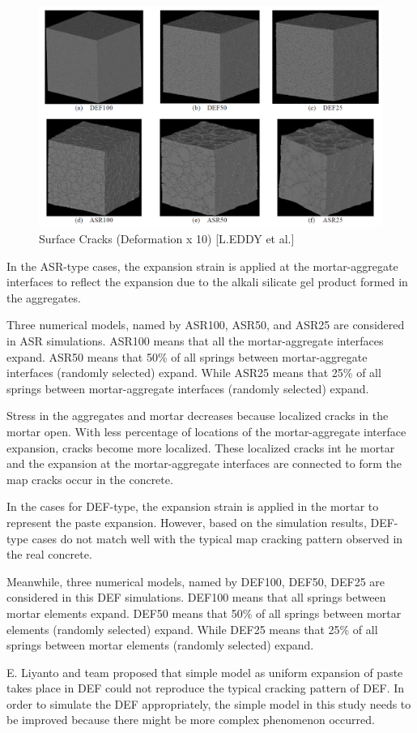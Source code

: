 \begin{itemize}
    \begin{figure}[ht!]
        \centering
        \includegraphics[width=.9\linewidth]{Files/Background/EDDY.png}
        \caption{Surface Cracks (Deformation x 10) [L.EDDY et al.]}
        \label{fig:EDDY}
    \end{figure}

    In the ASR-type cases, the expansion strain is applied at the mortar-aggregate interfaces to reflect the expansion due to the alkali silicate gel product formed in the aggregates.

    Three numerical models, named by ASR100, ASR50, and ASR25 are considered in ASR simulations. ASR100 means that all the mortar-aggregate interfaces expand. ASR50 means that 50\% of all springs between mortar-aggregate interfaces (randomly selected) expand. While ASR25 means that 25\% of all springs between mortar-aggregate interfaces (randomly selected) expand.

    Stress in the aggregates and mortar decreases because localized cracks in the mortar open. With less percentage of locations of the mortar-aggregate interface expansion, cracks become more localized. These localized cracks int he mortar and the expansion at the mortar-aggregate interfaces are connected to form the map cracks occur in the concrete.

    In the cases for DEF-type, the expansion strain is applied in the mortar to represent the paste expansion. However, based on the simulation results, DEF-type cases do not match well with the typical map cracking pattern observed in the real concrete.

    Meanwhile, three numerical models, named by DEF100, DEF50, DEF25 are considered in this DEF simulations. DEF100 means that all springs between mortar elements expand. DEF50 means that 50\% of all springs between mortar elements (randomly selected) expand. While DEF25 means that 25\% of all springs between mortar elements (randomly selected) expand.

    E. Liyanto and team proposed that simple model as uniform expansion of paste takes place in DEF could not reproduce the typical cracking pattern of DEF. In order to simulate the DEF appropriately, the simple model in this study needs to be improved because there might be more complex phenomenon occurred.

\end{itemize}

